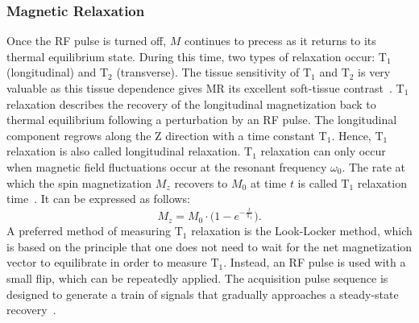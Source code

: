 \subsubsection{Magnetic Relaxation}
Once the RF pulse is turned off, $M$ continues to precess as it returns to its thermal equilibrium state. During this time, two types of relaxation occur: $\text{T}_1$ (longitudinal) and $\text{T}_2$ (transverse). The tissue sensitivity of $\text{T}_1$ and $\text{T}_2$ is very valuable as this tissue dependence gives MR its excellent soft-tissue contrast~\cite{Serai2021}. $\text{T}_1$ relaxation describes the recovery of the longitudinal magnetization back to thermal equilibrium following a perturbation by an RF pulse. The longitudinal component regrows along the Z direction with a time constant $\text{T}_1$. 
Hence, $\text{T}_1$ relaxation is also called longitudinal relaxation. 
$\text{T}_1$ relaxation can only occur when magnetic field fluctuations occur at the resonant frequency $\omega_0$. The rate at which the spin magnetization $M_z$ recovers to $M_0$ at time $t$ is called $\text{T}_1$ relaxation time~\cite{Serai2021}. It can be expressed as follows:
\begin{equation}
	M_z = M_0 \cdot \bigg(1 - e^{-\frac{t}{\text{T}_1}} \bigg).
\end{equation}
A preferred method of measuring $\text{T}_1$ relaxation is the Look-Locker method, which is based on the principle that one does not need to wait for the net magnetization vector to equilibrate in order to measure $\text{T}_1$. Instead, an RF pulse is used with a small flip, which can be repeatedly applied. The acquisition pulse sequence is designed to generate a train of signals that gradually approaches a steady-state recovery~\cite{Serai2021}. 

